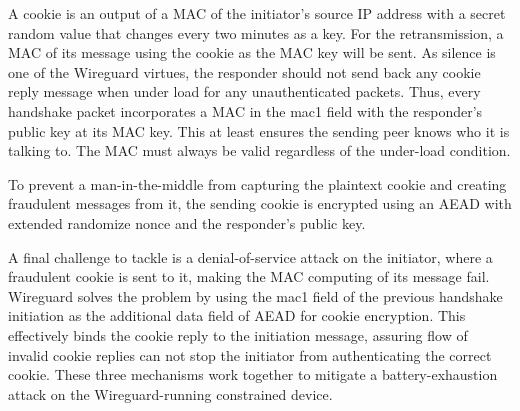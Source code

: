   A cookie is an output of a MAC of the initiator's source IP address with a secret random value that
  changes every two minutes as a key. For the retransmission, a MAC of its message using the cookie 
  as the MAC key will be sent. As silence is one of the Wireguard virtues, the responder should not 
  send back any cookie reply message when under load for any unauthenticated packets. Thus, every 
  handshake packet incorporates a MAC in the mac1 field with the responder's public key at its MAC key. 
  This at least ensures the sending peer knows who it is talking to. The MAC must always be valid 
  regardless of the under-load condition. 
  
  To prevent a man-in-the-middle from capturing the plaintext cookie and creating fraudulent messages from it,
  the sending cookie is encrypted using an AEAD with extended randomize nonce \cite{irtf-cfrg-xchacha-03} 
  and the responder's public key.

  A final challenge to tackle is a denial-of-service attack on the initiator, where a fraudulent cookie
  is sent to it, making the MAC computing of its message fail. Wireguard solves the problem by using
  the mac1 field of the previous handshake initiation as the additional data field of AEAD for cookie encryption. This
  effectively binds the cookie reply to the initiation message, assuring flow of invalid cookie replies
  can not stop the initiator from authenticating the correct cookie. These three mechanisms work together
  to mitigate a battery-exhaustion attack on the Wireguard-running constrained device.
